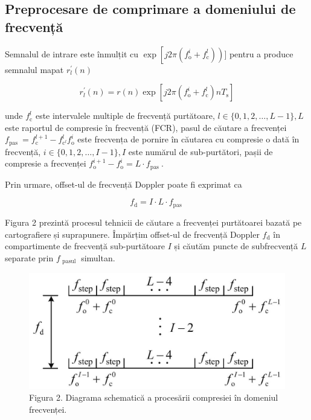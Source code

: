\documentclass[10pt]{report}
\begin{document}
\subsection*{Preprocesare de comprimare a domeniului de frecvență}
Semnalul de intrare este înmulțit cu \(\exp \left[j 2 \pi\left(f_{\mathrm{o}}^{i}+f_{\mathrm{c}}^{l}\right)\right) ]\) pentru a produce semnalul mapat \(r_{l}^{\prime}(n)\)


\begin{equation}
    r_{l}^{\prime}(n)=r(n) \exp \left[j 2 \pi\left(f_{\mathrm{o}}^{i}+f_{\mathrm{c}} ^{l}\right) n T_{\mathrm{s}}\right]
\end{equation}


unde \(f_{\mathrm{c}}^{l}\) este intervalele multiple de frecvență purtătoare, \(l \in\{0,1,2, \ldots, L-1\}, L\) este raportul de compresie în frecvență (FCR), pasul de căutare a frecvenței \(f_{\text {pas }}=f_{\mathrm{c}}^{l+1}-f_{\mathrm{c}^{l}} ^{l} f_{\mathrm{o}}^{i}\) este frecvența de pornire în căutarea cu compresie o dată în frecvență, \(i \in\{0,1,2, \ldots, I-1\}, I\) este numărul de sub-purtători, pașii de compresie a frecvenței \(f_{\mathrm{o}}^{i+1}-f_{\mathrm{o}}^{i}=L \cdot f_ {\text {pas }}\).

Prin urmare, offset-ul de frecvență Doppler poate fi exprimat ca

\begin{equation}
    f_{\mathrm{d}}=I \cdot L \cdot f_{\text {pas }}
\end{equation}

Figura 2 prezintă procesul tehnicii de căutare a frecvenței purtătoarei bazată pe cartografiere și suprapunere. Împărțim offset-ul de frecvență Doppler \(f_{\mathrm{d}}\) în compartimente de frecvență sub-purtătoare \(I\) și căutăm puncte de subfrecvență \(L\) separate prin \(f_{\text { pasul }}\) simultan.

\begin{figure}[h]
    \begin{center}
        \includegraphics[max width=12cm]{2023_06_04_7690788c3d6419e4c10eg-4}
        \caption*{Figura 2. Diagrama schematică a procesării compresiei în domeniul frecvenței.}
    \end{center}
\end{figure}
\end{document}
